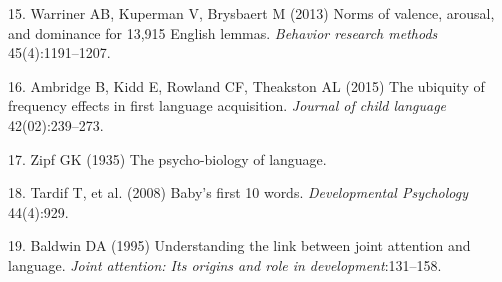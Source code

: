 \documentclass[9pt,twocolumn,twoside]{pnas-new}
\begin{document}
\hypertarget{ref-warriner2013}{}
15. Warriner AB, Kuperman V, Brysbaert M (2013) Norms of valence,
arousal, and dominance for 13,915 English lemmas. \emph{Behavior
research methods} 45(4):1191--1207.

\hypertarget{ref-ambridge2015}{}
16. Ambridge B, Kidd E, Rowland CF, Theakston AL (2015) The ubiquity of
frequency effects in first language acquisition. \emph{Journal of child
language} 42(02):239--273.

\hypertarget{ref-zipf1935}{}
17. Zipf GK (1935) The psycho-biology of language.

\hypertarget{ref-tardif2008}{}
18. Tardif T, et al. (2008) Baby's first 10 words. \emph{Developmental
Psychology} 44(4):929.

\hypertarget{ref-baldwin1995}{}
19. Baldwin DA (1995) Understanding the link between joint attention and
language. \emph{Joint attention: Its origins and role in
development}:131--158.



% 
\end{document}
